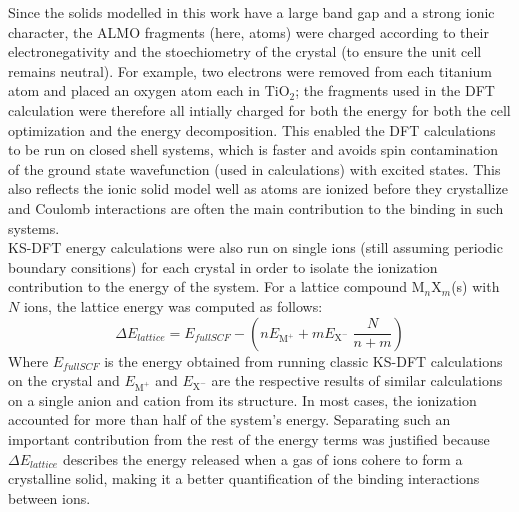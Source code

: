 \documentclass[aps,prb,twocolumn,amsmath,amssymb,superscriptaddress,longbibliography]{revtex4-1}
\begin{document}
Since the solids modelled in this work have a large band gap and a strong ionic character, the ALMO fragments (here, atoms) were charged according to their electronegativity and the stoechiometry of the crystal (to ensure the unit cell remains neutral). 
For example, two electrons were removed from each titanium atom and placed an oxygen atom each in $\text{TiO}_{2}$; the fragments used in the DFT calculation were therefore all intially charged for both the energy for both the cell optimization and the energy decomposition. 
This enabled the DFT calculations to be run on closed shell systems, which is faster and avoids spin contamination of the ground state wavefunction (used in calculations) with excited states.
This also reflects the ionic solid model well as atoms are ionized before they crystallize and Coulomb interactions are often the main contribution to the binding in such systems.\\


KS-DFT energy calculations were also run on single ions (still assuming periodic boundary consitions) for each crystal in order to isolate the ionization contribution to the energy of the system. 
For a lattice compound $\text{M}_{n}\text{X}_{m}$(s) with $N$ ions, the lattice energy was computed as follows: 
\begin{equation*}
\Delta E_{lattice} = E_{full SCF} - (n E_{\text{M}^{+}} + m E_{\text{X}^{-}}\;\frac{N}{n+m})
\end{equation*} 
Where $E_{full SCF}$ is the energy obtained from running classic KS-DFT calculations on the crystal and $E_{\text{M}^{+}}$ and $E_{\text{X}^{-}}$ are the respective results of similar calculations on a single anion and cation from its structure. 
In most cases, the ionization accounted for more than half of the system's energy. 
Separating such an important contribution from the rest of the energy terms was justified because $\Delta E_{lattice}$ describes the energy released when a gas of ions cohere to form a crystalline solid, making it a better quantification of the binding interactions between ions.



 
\end{document}
